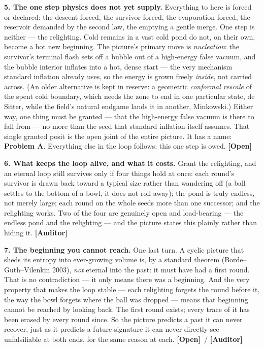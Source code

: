 \documentclass[11pt]{article}
\newcommand{\Open}{\textbf{\textcolor{gray!10!black}{[Open]}}}
\newcommand{\Auditor}{\textbf{\textcolor{teal!55!black}{[Auditor]}}}
\begin{document}
\noindent\textbf{5. The one step physics does not yet supply.} Everything to here is forced or declared: the descent forced, the survivor forced, the evaporation forced, the reservoir demanded by the second law, the emptying a gentle merge. One step is neither --- the relighting. Cold remains in a vast cold pond do not, on their own, become a hot new beginning. The picture's primary move is \emph{nucleation}: the survivor's terminal flash sets off a bubble out of a high-energy false vacuum, and the bubble interior inflates into a hot, dense start --- the very mechanism standard inflation already uses, so the energy is grown freely \emph{inside}, not carried across. (An older alternative is kept in reserve: a geometric \emph{conformal rescale} of the spent cold boundary, which needs the zone to end in one particular state, de Sitter, while the field's natural endgame lands it in another, Minkowski.) Either way, one thing must be granted --- that the high-energy false vacuum is there to fall from --- no more than the seed that standard inflation itself assumes. That single granted posit is the open joint of the entire picture. It has a name: \textbf{Problem A}. Everything else in the loop follows; this one step is owed. \Open

\noindent\textbf{6. What keeps the loop alive, and what it costs.} Grant the relighting, and an eternal loop still survives only if four things hold at once: each round's survivor is drawn back toward a typical size rather than wandering off (a ball settles to the bottom of a bowl, it does not roll away); the pond is truly endless, not merely large; each round on the whole seeds more than one successor; and the relighting works. Two of the four are genuinely open and load-bearing --- the endless pond and the relighting --- and the picture states this plainly rather than hiding it. \Auditor

\noindent\textbf{7. The beginning you cannot reach.} One last turn. A cyclic picture that sheds its entropy into ever-growing volume is, by a standard theorem (Borde--Guth--Vilenkin 2003), \emph{not} eternal into the past: it must have had a first round. That is no contradiction --- it only means there was a beginning. And the very property that makes the loop stable --- each relighting forgets the round before it, the way the bowl forgets where the ball was dropped --- means that beginning cannot be reached by looking back. The first round exists; every trace of it has been erased by every round since. So the picture predicts a past it can never recover, just as it predicts a future signature it can never directly see --- unfalsifiable at both ends, for the same reason at each. \Open\ / \Auditor
\end{document}
